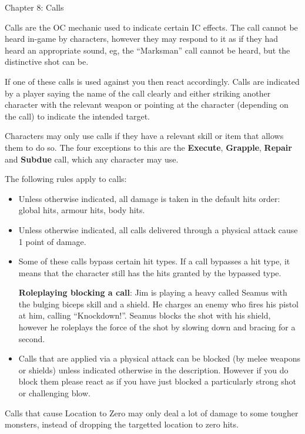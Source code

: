 \documentclass{scrbook}
\begin{document}
Chapter 8: Calls

Calls are the OC mechanic used to indicate certain IC effects. The call cannot be heard in-game by characters, however they may respond to it as if they had heard an appropriate sound, eg, the ``Marksman'' call cannot be heard, but the distinctive shot can be.

If one of these calls is used against you then react accordingly. Calls are indicated by a player saying the name of the call clearly and either striking another character with the relevant weapon or pointing at the character (depending on the call) to indicate the intended target.

Characters may only use calls if they have a relevant skill or item that allows them to do so. The four exceptions to this are the \textbf{Execute}, \textbf{Grapple}, \textbf{Repair} and \textbf{Subdue} call, which any character may use.

The following rules apply to calls:

\begin{itemize}
\item Unless otherwise indicated, all damage is taken in the default hits order: global hits, armour hits, body hits.

\item Unless otherwise indicated, all calls delivered through a physical attack cause 1 point of damage.

\item Some of these calls bypass certain hit types. If a call bypasses a hit type, it means that the character still has the hits granted by the bypassed type.

\textbf{Roleplaying blocking a call}: Jim is playing a heavy called Seamus with the bulging biceps skill and a shield. He charges an enemy who fires his pistol at him, calling ``Knockdown!''. Seamus blocks the shot with his shield, however he roleplays the force of the shot by slowing down and bracing for a second.

\item Calls that are applied via a physical attack can be blocked (by melee weapons or shields) unless indicated otherwise in the description. However if you do block them please react as if you have just blocked a particularly strong shot or challenging blow.

\end{itemize}
Calls that cause Location to Zero may only deal a lot of damage to some tougher monsters, instead of dropping the targetted location to zero hits.
\end{document}
